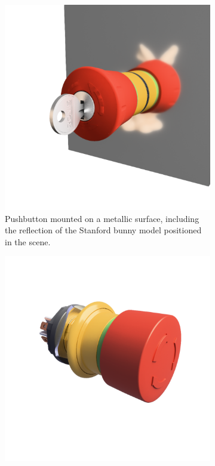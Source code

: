 \begin{figure}[H]
    \centering
    \hspace*{1cm}
    \begin{subfigure}[t]{0.4\textwidth}
        \includegraphics[width=\textwidth]{resources/demo-reflection.png}
        \caption{Pushbutton mounted on a metallic surface, including the reflection of the Stanford bunny model \cite{turkLevoy1994} positioned in the scene.}
        \label{fig:demo-reflection}
    \end{subfigure}
    \hfill
    \begin{subfigure}[t]{0.4\textwidth}
        \includegraphics[width=\textwidth]{resources/demo-specular.png}

\end{subfigure}
\end{figure}
